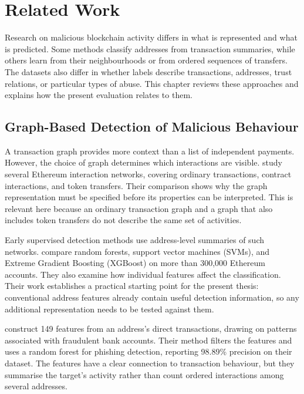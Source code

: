 \chapter{Related Work}
\label{chap:relatedwork}

Research on malicious blockchain activity differs in what is represented and
what is predicted. Some methods classify addresses from transaction summaries,
while others learn from their neighbourhoods or from ordered sequences of
transfers. The datasets also differ in whether labels describe transactions,
addresses, trust relations, or particular types of abuse. This chapter reviews
these approaches and explains how the present evaluation relates to them.

\section{Graph-Based Detection of Malicious Behaviour}
\label{sec:related_graph_detection}

A transaction graph provides more context than a list of independent payments.
However, the choice of graph determines which interactions are visible.
\citet{lee2020ethereum} study several Ethereum interaction networks, covering
ordinary transactions, contract interactions, and token transfers. Their
comparison shows why the graph representation must be specified before its
properties can be interpreted. This is relevant here because an ordinary
transaction graph and a graph that also includes token transfers do not describe
the same set of activities.

Early supervised detection methods use address-level summaries of such
networks. \citet{ostapowicz2019detecting} compare random forests, support vector
machines (SVMs), and Extreme Gradient Boosting (XGBoost) on more than 300,000
Ethereum accounts. They also examine how individual features affect the
classification. Their work establishes a practical starting point for the
present thesis: conventional address features already contain useful detection
information, so any additional representation needs to be tested against them.

\citet{chen2022phishing} construct 149 features from an address's direct
transactions, drawing on patterns associated with fraudulent bank accounts.
Their method filters the features and uses a random forest for phishing
detection, reporting 98.89\% precision on their dataset. The features have a
clear connection to transaction behaviour, but they summarise the target's
activity rather than count ordered interactions among several addresses.

